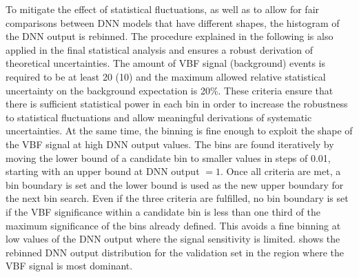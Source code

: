 To mitigate the effect of statistical fluctuations, as well as to allow for fair comparisons between DNN models that have different shapes, the histogram of the DNN output is rebinned. The procedure explained in the following is also applied in the final statistical analysis and ensures a robust derivation of theoretical uncertainties.
The amount of VBF signal (background) events is required to be at least 20 (10) and the maximum allowed relative statistical uncertainty on the background expectation is 20\%.
These criteria ensure that there is sufficient statistical power in each bin in order to increase the robustness to statistical fluctuations and allow meaningful derivations of systematic uncertainties. At the same time, the binning is fine enough to exploit the shape of the VBF signal at high DNN output values.
The bins are found iteratively by moving the lower bound of a candidate bin to smaller values in steps of 0.01, starting with an upper bound at DNN output $= 1$. Once all criteria are met, a bin boundary is set and the lower bound is used as the new upper boundary for the next bin search. Even if the three criteria are fulfilled, no bin boundary is set if the VBF significance within a candidate bin is less than one third of the maximum significance of the bins already defined. This avoids a fine binning at low values of the DNN output where the signal sensitivity is limited.
 shows the rebinned DNN output distribution for the validation set in the region where the VBF signal is most dominant.
